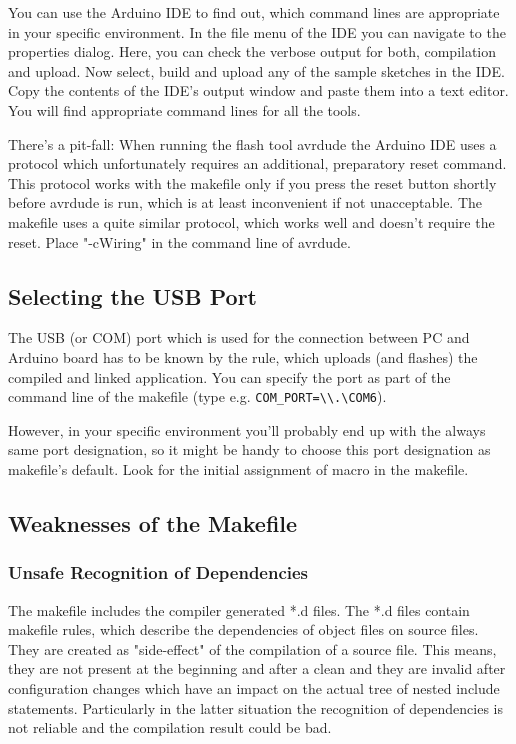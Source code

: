 You can use the Arduino IDE to find out, which command lines are
appropriate in your specific environment. In the file menu of the IDE you
can navigate to the properties dialog. Here, you can check the verbose
output for both, compilation and upload. Now select, build and upload
any of the sample sketches in the IDE. Copy the contents of the IDE's
output window and paste them into a text editor. You will find appropriate
command lines for all the tools.

There's a pit-fall: When running the flash tool avrdude the Arduino IDE
uses a protocol which unfortunately requires an additional, preparatory
reset command. This protocol works with the makefile only if you press the
reset button shortly before avrdude is run, which is at least inconvenient
if not unacceptable. The makefile uses a quite similar protocol, which
works well and doesn't require the reset. Place "-cWiring" in the command
line of avrdude.


\subsection{Selecting the USB Port}

The USB (or COM) port which is used for the connection between PC and
Arduino board has to be known by the rule, which uploads (and flashes)
the compiled and linked application. You can specify the port as part of
the command line of the makefile (type e.g. \verb+COM_PORT=\\.\COM6+).

However, in your specific environment you'll probably end up with the
always same port designation, so it might be handy to choose this port
designation as makefile's default. Look for the initial assignment of
macro  in the makefile.


\subsection{Weaknesses of the Makefile}

\subsubsection{Unsafe Recognition of Dependencies}

The makefile includes the compiler generated *.d files. The *.d files
contain makefile rules, which describe the dependencies of object files on
source files. They are created as "side-effect" of the compilation of a
source file. This means, they are not present at the beginning and after a
clean and they are invalid after configuration changes which have an
impact on the actual tree of nested include statements. Particularly in
the latter situation the recognition of dependencies is not reliable and
the compilation result could be bad.

